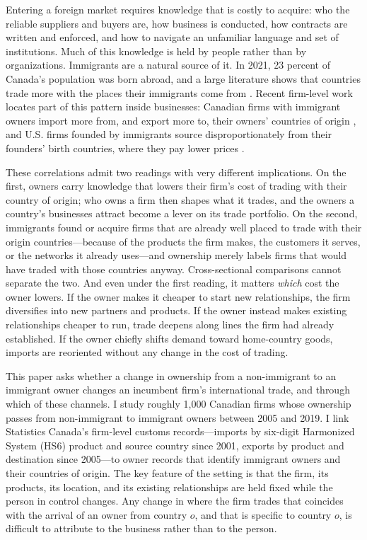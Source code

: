 \documentclass[12pt]{article}
\theoremstyle{remark}
\begin{document}
Entering a foreign market requires knowledge that is costly to acquire: who
the reliable suppliers and buyers are, how business is conducted, how
contracts are written and enforced, and how to navigate an unfamiliar
language and set of institutions. Much of this knowledge is held by people
rather than by organizations. Immigrants are a natural source of it. In 2021,
23 percent of Canada's population was born abroad, and a large literature
shows that countries trade more with the places their immigrants come from
\citep{gould1994,headries1998,rauchtrindade2002}. Recent firm-level work
locates part of this pattern inside businesses: Canadian firms with immigrant
owners import more from, and export more to, their owners' countries of
origin \citep{fung2019,fungliu2025}, and U.S. firms founded by immigrants
source disproportionately from their founders' birth countries, where they pay
lower prices \citep{chikissaygin2026}.

These correlations admit two readings with very different implications. On
the first, owners carry knowledge that lowers their firm's cost of trading
with their country of origin; who owns a firm then shapes what it trades, and
the owners a country's businesses attract become a lever on its trade
portfolio. On the second, immigrants found or acquire firms that are already
well placed to trade with their origin countries---because of the products
the firm makes, the customers it serves, or the networks it already
uses---and ownership merely labels firms that would have traded with those
countries anyway. Cross-sectional comparisons cannot separate the two. And
even under the first reading, it matters \emph{which} cost the owner lowers.
If the owner makes it cheaper to start new relationships, the firm diversifies
into new partners and products. If the owner instead makes existing
relationships cheaper to run, trade deepens along lines the firm had already
established. If the owner chiefly shifts demand toward home-country goods,
imports are reoriented without any change in the cost of trading.

This paper asks whether a change in ownership from a non-immigrant to an
immigrant owner changes an incumbent firm's international trade, and through
which of these channels. I study roughly 1,000 Canadian firms whose ownership
passes from non-immigrant to immigrant owners between 2005 and 2019. I link
Statistics Canada's firm-level customs records---imports by six-digit
Harmonized System (HS6) product and source country since 2001, exports by
product and destination since 2005---to owner records that identify immigrant
owners and their countries of origin. The key feature of the setting is that
the firm, its products, its location, and its existing relationships are held
fixed while the person in control changes. Any change in where the firm trades
that coincides with the arrival of an owner from country $o$, and that is
specific to country $o$, is difficult to attribute to the business rather
than to the person.
\end{document}
